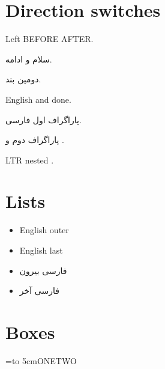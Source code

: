 \documentclass{article}
\begin{document}
\section*{Direction switches}
Left BEFORE  AFTER.\par
\setRTL سلام و  ادامه.\par دومین بند.\par
\setLTR English and  done.\par
\begin{RTL}پاراگراف اول فارسی.\par پاراگراف دوم و .\par
\begin{LTR}LTR nested .\end{LTR}
\end{RTL}
\newpage
\section*{Lists}
\begin{itemize}\item English outer \item English last\end{itemize}
\begin{RTL}\begin{itemize}\item فارسی بیرون
\item فارسی آخر\end{itemize}\end{RTL}
\newpage
\section*{Boxes}
 
=\hboxR to 5cm{ONE\hfil TWO}
\newpage
\end{document}
